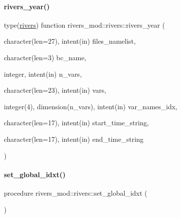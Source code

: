 \paragraph{\texorpdfstring{rivers\+\_\+year()}{rivers\_year()}}
{\footnotesize\ttfamily type(\mbox{\hyperlink{structrivers__mod_1_1rivers}{rivers}}) function rivers\+\_\+mod\+::rivers\+::rivers\+\_\+year (\begin{DoxyParamCaption}\item[{character(len=27), intent(in)}]{files\+\_\+namelist,  }\item[{character(len=3)}]{bc\+\_\+name,  }\item[{integer, intent(in)}]{n\+\_\+vars,  }\item[{character(len=23), intent(in)}]{vars,  }\item[{integer(4), dimension(n\+\_\+vars), intent(in)}]{var\+\_\+names\+\_\+idx,  }\item[{character(len=17), intent(in)}]{start\+\_\+time\+\_\+string,  }\item[{character(len=17), intent(in)}]{end\+\_\+time\+\_\+string }\end{DoxyParamCaption})\hspace{0.3cm}{\ttfamily [private]}}

\mbox{\label{structrivers__mod_1_1rivers_a378a92f6f66820ec146e52b2c55803fc}} 
\paragraph{\texorpdfstring{set\+\_\+global\+\_\+idxt()}{set\_global\_idxt()}}
{\footnotesize\ttfamily procedure rivers\+\_\+mod\+::rivers\+::set\+\_\+global\+\_\+idxt (\begin{DoxyParamCaption}{ }\end{DoxyParamCaption})\hspace{0.3cm}{\ttfamily [private]}}

\mbox{\label{structrivers__mod_1_1rivers_a47e4b220c2eaf84a5ddbddd2c504f3c7}} 
